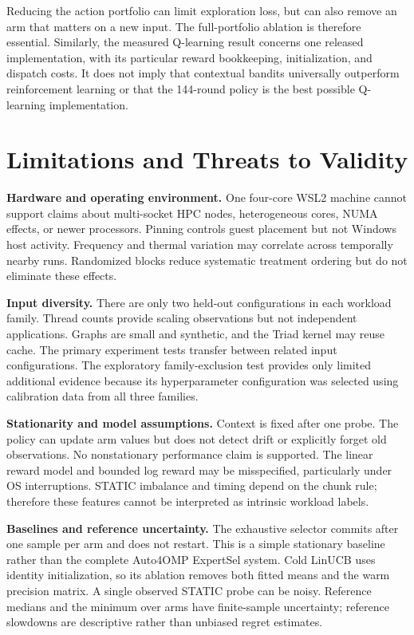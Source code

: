 \documentclass[10pt,letterpaper]{article}
\begin{document}
Reducing the action portfolio can limit exploration loss, but can also remove
an arm that matters on a new input. The full-portfolio ablation is therefore
essential. Similarly, the measured Q-learning result concerns one released
implementation, with its particular reward bookkeeping, initialization, and
dispatch costs. It does not imply that contextual bandits universally
outperform reinforcement learning or that the 144-round policy is the best
possible Q-learning implementation.

\section{Limitations and Threats to Validity}

\textbf{Hardware and operating environment.} One four-core WSL2 machine cannot
support claims about multi-socket HPC nodes, heterogeneous cores, NUMA effects,
or newer processors. Pinning controls guest placement but not Windows host
activity. Frequency and thermal variation may correlate across temporally
nearby runs. Randomized blocks reduce systematic treatment ordering but do not
eliminate these effects.

\textbf{Input diversity.} There are only two held-out configurations in each
workload family. Thread counts provide scaling observations but not independent
applications. Graphs are small and synthetic, and the Triad kernel may reuse
cache. The primary experiment tests transfer between related input
configurations. The exploratory family-exclusion test provides only limited
additional evidence because its hyperparameter configuration was selected
using calibration data from all three families.

\textbf{Stationarity and model assumptions.} Context is fixed after one probe.
The policy can update arm values but does not detect drift or explicitly forget
old observations. No nonstationary performance claim is supported. The linear
reward model and bounded log reward may be misspecified, particularly under
OS interruptions. STATIC imbalance and timing depend on the chunk rule;
therefore these features cannot be interpreted as intrinsic workload labels.

\textbf{Baselines and reference uncertainty.} The exhaustive selector commits
after one sample per arm and does not restart. This is a simple stationary
baseline rather than the complete Auto4OMP ExpertSel system. Cold LinUCB uses
identity initialization, so its ablation removes both fitted means and the
warm precision matrix. A single observed STATIC probe can be noisy. Reference
medians and the minimum over arms have finite-sample uncertainty; reference
slowdowns are descriptive rather than unbiased regret estimates.
\end{document}
